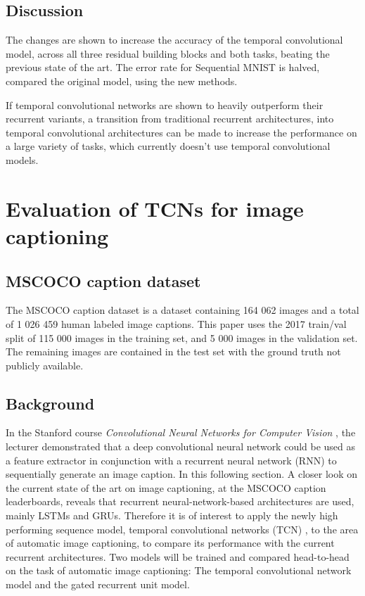\documentclass[a4paper, twoside]{article}
\begin{document}
\subsection{Discussion}
The changes are shown to increase the accuracy of the temporal convolutional model, across all three residual building blocks and both tasks, beating the previous state of the art.  The error rate for Sequential MNIST is halved, compared the original model, using the new methods.

If temporal convolutional networks are shown to heavily outperform their recurrent variants, a transition from traditional recurrent architectures, into temporal convolutional architectures can be made to increase the performance on a large variety of tasks, which currently doesn't use temporal convolutional models.

\section{Evaluation of TCNs for image captioning}
\subsection{MSCOCO caption dataset}
The MSCOCO caption dataset \cite{mscoco} is a dataset containing 164 062 images and a total of 1 026 459 human labeled image captions. This paper uses the 2017 train/val split of 115 000 images in the training set, and 5 000 images in the validation set. The remaining images are contained in the test set with the ground truth not publicly available.

\subsection{Background}
In the Stanford course \textit{Convolutional Neural Networks for Computer Vision} \cite{cs231n}, the lecturer demonstrated that a deep convolutional neural network could be used as a feature extractor in conjunction with a recurrent neural network (RNN) to sequentially generate an image caption. In this following section. A closer look on the current state of the art on image captioning, at the MSCOCO caption leaderboards, reveals that recurrent neural-network-based architectures are used, mainly LSTMs and GRUs. Therefore it is of interest to apply the newly high performing sequence model, temporal convolutional networks (TCN) \cite{tcn}, to the area of automatic image captioning, to compare its performance with the current recurrent architectures. Two models will be trained and compared head-to-head on the task of automatic image captioning: The temporal convolutional network model and the gated recurrent unit model.
\end{document}
